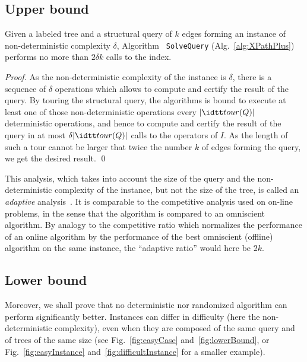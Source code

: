 \subsection{Upper bound}

\begin{theorem}\label{th:complexity}
Given a labeled tree and a structural query of $k$ edges forming an
instance of non-deterministic complexity $\delta$, Algorithm {\tt
SolveQuery} (Alg.~\ref{alg:XPathPlus}) performs no more than $2\delta
k$ calls to the index.
\end{theorem}

\begin{proof}
As the non-deterministic complexity of the instance is $\delta$, there
is a sequence of $\delta$ operations which allows to compute and
certify the result of the query.
%
By touring the structural query, the algorithms is bound to execute at
least one of those non-deterministic operations every $|\tour(Q)|$
deterministic operations, and hence to compute and certify the result
of the query in at most $\delta |\tour(Q)|$ calls to the operators of
$I$.
%
As the length of such a tour cannot be larger that twice the number
$k$ of edges forming the query, we get the desired result.
\qed\end{proof}

This analysis, which takes into account the size of the query and the
non-deterministic complexity of the instance, but not the size of the
tree, is called an {\em adaptive}
analysis~\cite{estivillcastro92survey,petersson,adaptiveIntersectionAndTThresholdProblems}.
% 
It is comparable to the competitive analysis used on on-line problems,
in the sense that the algorithm is compared to an omniscient
algorithm.
%
By analogy to the competitive ratio which normalizes the performance of
an online algorithm by the performance of the best omniscient
(offline) algorithm on the same instance, the ``adaptive ratio'' would
here be $2k$.
%

\subsection{Lower bound}

Moreover, we shall prove that no deterministic nor randomized
algorithm can perform significantly better.
%
Instances can differ in difficulty (here the non-deterministic
complexity), even when they are composed of the same query and of
trees of the same size (see Fig.~\ref{fig:easyCase}
and~\ref{fig:lowerBound}, or Fig.~\ref{fig:easyInstance}
and~\ref{fig:difficultInstance} for a smaller example).


